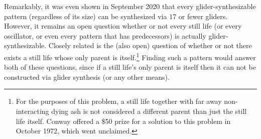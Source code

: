 Remarkably, it was even shown in September 2020 that every glider-synthesizable pattern (regardless of its size) can be synthesized via $17$ or fewer gliders. However, it remains an open question whether or not every still life (or every oscillator, or even every pattern that has predecessors) is actually glider-synthesizable. Closely related is the (also open) question of whether or not there exists a still life whose only parent is itself.\footnote{For the purposes of this problem, a still life together with far away non-interacting dying ash is not considered a different parent than just the still life itself. Conway offered a \$50 prize for a solution to this problem in October 1972, which went unclaimed.} Finding such a pattern would answer both of these questions, since if a still life's only parent is itself then it can not be constructed via glider synthesis (or any other means).




